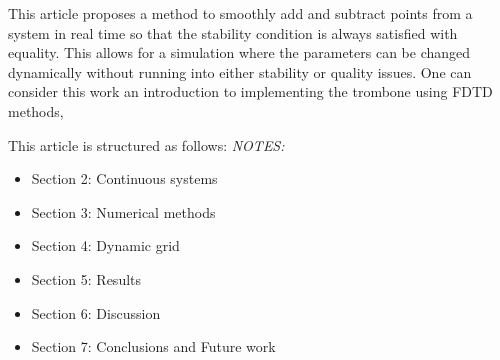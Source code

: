 This article proposes a method to smoothly add and subtract points from a system in real time so that the stability condition is always satisfied with equality. This allows for a simulation where the parameters can be changed dynamically without running into either stability or quality issues. One can consider this work an introduction to implementing the trombone using FDTD methods, 

This article is structured as follows: 
\textit{NOTES:}
\begin{itemize}
\item Section 2: Continuous systems
\item Section 3: Numerical methods
\item Section 4: Dynamic grid
\item Section 5: Results
\item Section 6: Discussion
\item Section 7: Conclusions and Future work
\end{itemize}


